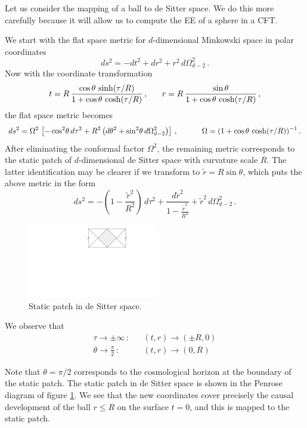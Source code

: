 \documentclass[11pt,a4paper]{article}
\numberwithin{equation}{section}
\newcommand\eea{\end{eqnarray}}
\newcommand\bea{\begin{eqnarray}}
\def\beq{\begin{equation}}
\def\eeq{\end{equation}}
\newcommand{\be}{\begin{equation}}
\newcommand{\ee}{\end{equation}}
\begin{document}
Let us consider the mapping of a ball to de Sitter space. We do this more carefully because it will allow us to compute the EE of a sphere in a CFT. 
 
 We start
 with the flat space metric for $d$-dimensional Minkowski space in
polar coordinates
%
 \beq
ds^2=-dt^2+dr^2+r^2\,d\Omega^2_{d-2}\,.
 \label{flat1}
 \eeq
%
Now with the coordinate transformation
%
 \be
t=R\,\frac{\cos\theta\,\sinh(\tau/R)}{1+\cos\theta\,\cosh(\tau/R)}\,,\hspace{.6cm}
 \label{trn2}
%
r=R\,\frac{\sin\theta}{1+\cos\theta\,\cosh(\tau/R)}\,,
 \ee
%
 the flat space metric  becomes
%
 \be
ds^2=\Omega^2\, \left[-\cos^2\!\theta\, d\tau^2+
R^2\left(d\theta^2+\sin^2\!\theta\,d\Omega^2_{d-2}\right)\right]\,,\hspace{.4cm}
 \label{round0}
%
\qquad\Omega=(1+\cos\theta\,\cosh(\tau/R))^{-1}\,.
 \ee
%
After eliminating the conformal factor $\Omega^2$, the remaining metric
corresponds to the static patch of $d$-dimensional de Sitter space with
curvature scale $R$. The latter identification may be clearer if we
transform to $\tilde{r}= R\sin\theta$, which puts the above metric in the
form
%
 \beq
ds^2=-\left(
1-\frac{\tilde{r}^2}{R^2}\right)\,d\tau^2+\frac{d \tilde{r}^2}{1-\frac{\tilde{r}^2}{R^2}}
+\tilde{r}^2\,d\Omega^2_{d-2}\,.
 \label{twor}
 \eeq
%
\begin{figure}[t]
\begin{center}  
\includegraphics[width=0.5\textwidth]{desitter.pdf}
\captionsetup{width=0.9\textwidth}
\caption{Static patch in de Sitter space. }
\label{ds}
\end{center}  
\end{figure}

We observe that
%
 \bea
\tau\rightarrow\pm\infty\,:&&(t,r)\rightarrow(\pm R,0)\label{junker9}\\
\theta\rightarrow\frac{\pi}{2}\,:&&(t,r)\rightarrow(0,R)\nonumber
 \eea
%

Note that $\theta=\pi/2$ corresponds to the cosmological horizon at the
boundary of the static patch. The static patch in de Sitter space is shown in the Penrose diagram of figure \ref{ds}. We
see that the new coordinates cover precisely the causal development of the ball $r\le R$ on the surface $t=0$, and this is mapped to the static patch. 
\end{document}
